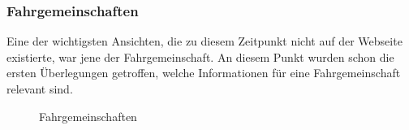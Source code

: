 \subsubsection{Fahrgemeinschaften}\label{mockups_carpools}
Eine der wichtigsten Ansichten, die zu diesem Zeitpunkt nicht auf der Webseite existierte, war jene der Fahrgemeinschaft. An diesem Punkt wurden schon die ersten Überlegungen getroffen, welche Informationen für eine Fahrgemeinschaft relevant sind.
\begin{figure}[ht]
\centering
{}
\label{fig:mockup_carpool}
\caption{Fahrgemeinschaften}
\end{figure}

